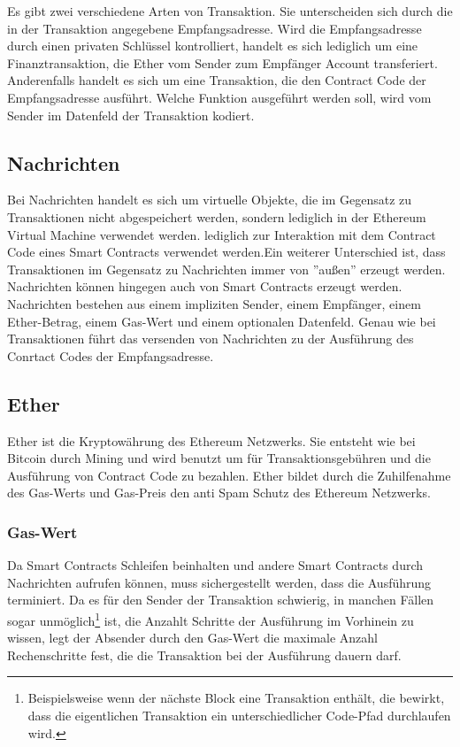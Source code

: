 Es gibt zwei verschiedene Arten von Transaktion. Sie unterscheiden sich durch die in der Transaktion angegebene Empfangsadresse. 
Wird die Empfangsadresse durch einen privaten Schlüssel kontrolliert, handelt es sich lediglich um eine Finanztransaktion, die Ether vom Sender zum Empfänger Account transferiert. Anderenfalls handelt es sich um eine Transaktion, die den Contract Code der Empfangsadresse ausführt. Welche Funktion ausgeführt werden soll, wird vom Sender im Datenfeld der Transaktion kodiert.

\subsection{Nachrichten}\label{eth_messages}
Bei Nachrichten handelt es sich um virtuelle Objekte, die im Gegensatz zu Transaktionen nicht abgespeichert werden, sondern lediglich in der Ethereum Virtual Machine verwendet werden. \if lediglich zur Interaktion mit dem Contract Code eines Smart Contracts verwendet werden.\fi Ein weiterer Unterschied ist, dass Transaktionen im Gegensatz zu Nachrichten immer von ''außen'' erzeugt werden. Nachrichten können hingegen auch von Smart Contracts erzeugt werden. Nachrichten bestehen aus einem impliziten Sender, einem Empfänger, einem Ether-Betrag, einem Gas-Wert und einem optionalen Datenfeld. Genau wie bei Transaktionen führt das versenden von Nachrichten zu der Ausführung des Conrtact Codes der Empfangsadresse.

\subsection{Ether}\label{eth_ether} 
Ether ist die Kryptowährung des Ethereum Netzwerks. Sie entsteht wie bei Bitcoin durch Mining und wird benutzt um für Transaktionsgebühren und die Ausführung von Contract Code zu bezahlen. Ether bildet durch die Zuhilfenahme des Gas-Werts und Gas-Preis den anti Spam Schutz des Ethereum Netzwerks.
\subsubsection{Gas-Wert}
Da Smart Contracts Schleifen beinhalten und andere Smart Contracts durch Nachrichten aufrufen können, muss sichergestellt werden, dass die Ausführung terminiert. Da es für den Sender der Transaktion schwierig, in manchen Fällen sogar unmöglich\footnote{Beispielsweise wenn der nächste Block eine Transaktion enthält, die bewirkt, dass die eigentlichen Transaktion ein unterschiedlicher Code-Pfad durchlaufen wird.} ist, die Anzahlt Schritte der Ausführung im Vorhinein zu wissen, legt der Absender durch den Gas-Wert die maximale Anzahl Rechenschritte fest, die die Transaktion bei der Ausführung dauern darf.
